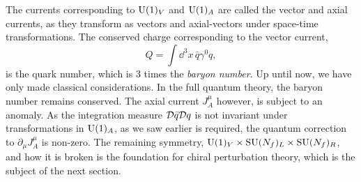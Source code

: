 The currents corresponding to $\mathrm{U}(1)_V$ and $\mathrm{U}(1)_A$ are called the vector and axial currents, as they transform as vectors and axial-vectors under space-time transformations.
The conserved charge corresponding to the vector current,
\begin{equation}
    Q = \int \dd^3 x \, \bar q \gamma^0 q,
\end{equation}
is the quark number, which is $3$ times the \emph{baryon number}.
Up until now, we have only made classical considerations.
In the full quantum theory, the baryon number remains conserved.
The axial current $J^\mu_A$ however, is subject to an anomaly.
As the integration measure $\mathcal{D}\bar q \mathcal{D} q$ is not invariant under transformations in $\mathrm{U}(1)_A$, as we saw earlier is required, the quantum correction to $\partial_\mu J^\mu_A$ is non-zero.
The remaining symmetry, $\mathrm{U}(1)_V \times \mathrm{SU}(N_f)_L \times \mathrm{SU}(N_f)_R$, and how it is broken is the foundation for chiral perturbation theory, which is the subject of the next section.
